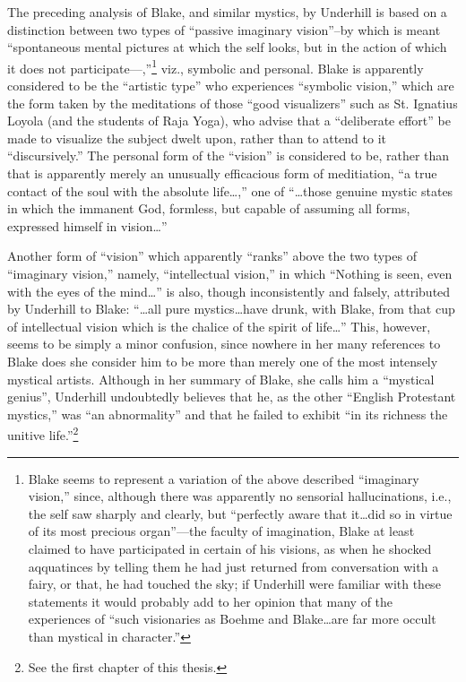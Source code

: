 The preceding analysis of Blake, and similar mystics, by
Underhill is based on a distinction between two types of
\enquote{passive imaginary vision}--by which is meant \enquote{spontaneous mental
pictures at which the self looks, but in the action of which it does not participate---,}\footnote{Blake seems to represent a variation of the above described \enquote{imaginary vision,} since, although there was apparently no sensorial hallucinations, i.e., the self saw sharply and clearly, but \enquote{perfectly aware that it\dots did so in virtue of its most precious organ}---the faculty of imagination, Blake at least claimed to have participated in certain of his visions, as when he shocked aqquatinces by telling them he had just returned from conversation with a fairy, or that, he had touched the sky; if Underhill were familiar with these statements it would probably add to her opinion that many of the experiences of \enquote{such visionaries as Boehme and Blake\dots are far more occult than mystical in character.}\supercite{underhill:mysticism}}
viz., symbolic and personal. Blake is apparently considered to be the \enquote{artistic type} who
experiences \enquote{symbolic vision,} which are the form taken by the
meditations of those \enquote{good visualizers} such as St. Ignatius Loyola (and the students of Raja Yoga),
who advise that a \enquote{deliberate effort} be made to visualize the subject dwelt upon, rather than to attend
to it \enquote{discursively.}\supercite{underhill:mysticism}
The personal form of the \enquote{vision} is considered to be, rather than
that is apparently merely an unusually efficacious form of meditiation, \enquote{a true contact of the soul with
the absolute life\dots,} one of \enquote{\dots those genuine mystic states in which the immanent God, formless, but capable
of assuming all forms, expressed himself in vision\dots}\supercite{underhill:mysticism}

Another form of \enquote{vision} which apparently \enquote{ranks} above the
two types of \enquote{imaginary vision,} namely, \enquote{intellectual vision,} in
which \enquote{Nothing is seen, even with the eyes of the mind\dots}\supercite{underhill:mysticism}
is also, though inconsistently and falsely, attributed by Underhill to Blake: \enquote{\dots all pure mystics\dots have drunk, with Blake, from
that cup of intellectual vision which is the chalice of the spirit of life\dots}\supercite{underhill:mysticism}
This, however, seems to be simply a minor confusion, since nowhere in her many references to Blake does she consider him to be more than merely one of the most
intensely mystical artists. Although in her summary of Blake, she calls him a \enquote{mystical genius}, Underhill undoubtedly believes that
he, as the other \enquote{English Protestant mystics,}\supercite{underhill:mysticism}
was \enquote{an abnormality} and that he failed to exhibit \enquote{in its richness the unitive life.}\supercite{underhill:mysticism}\footnote{See the first chapter of this thesis.}

